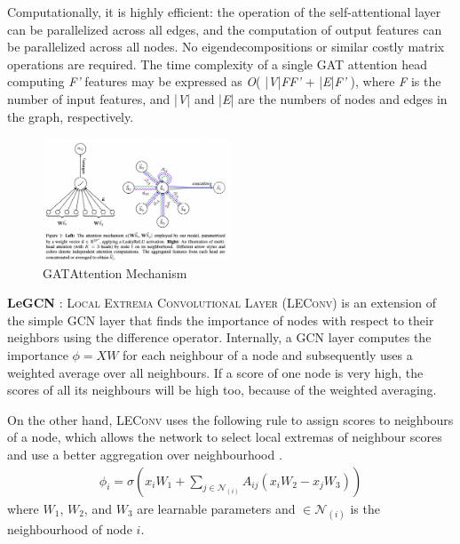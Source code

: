 \documentclass[sigconf, nonacm]{acmart}
\begin{document}
Computationally, it is highly efficient: the operation of the self-attentional layer can be parallelized across all edges, and the computation of output features can be parallelized across all nodes. No eigendecompositions or similar costly matrix operations are required. The time complexity of a single \textsc{GAT} attention head computing \textit{F'} features may be expressed as \textit{O}( |\textit{V}|\textit{FF'} + |\textit{E}|\textit{F'} ), where \textit{F} is the number of input features, and |\textit{V}| and |\textit{E}| are the numbers of nodes and edges in the graph, respectively. 

\begin{figure}[h]
    \centering
    \includegraphics[width=0.5\textwidth]{GAT.png} 
    \caption{\textsc{GAT}Attention Mechanism \cite{Velickovic2017}}
    \label{fig:GAT}
\end{figure}

\textbf{Le\textsc{GCN}} : \textsc{Local Extrema Convolutional Layer (\textsc{LEConv})} \cite{LeConvPaper} is an extension of the simple \textsc{GCN} layer that finds the importance of nodes with respect to their neighbors using the difference operator. Internally, a \textsc{GCN} layer computes the importance $\phi = XW$ for each neighbour of a node and subsequently uses a weighted average over all neighbours. If a score of one node is very high, the scores of all its neighbours will be high too, because of the weighted averaging. 

On the other hand, \textsc{LEConv} uses the following rule to assign scores to neighbours of a node, which allows the network to select local extremas of neighbour scores and use a better aggregation over neighbourhood \cite{LeConvPaper}.
\begin{align} 
\phi_i = \sigma \left(x_i W_1 + \sum_{j \in \mathcal{N}_{(i)}} A_{ij} \left(x_i W_2 - x_j W_3\right) \right)
\end{align} 
where $W_1$, $W_2$, and $W_3$ are learnable parameters and $\in \mathcal{N}_{(i)}$ is the neighbourhood of node $i$.
\end{document}
